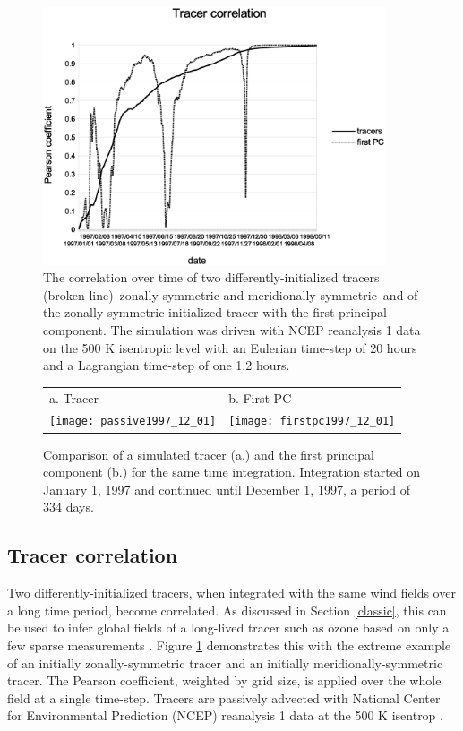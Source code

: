 \begin{figure}
\begin{center}
\includegraphics[width=0.9\textwidth]{tracer_correlation}
\caption{The correlation over time of two differently-initialized tracers
(broken line)--zonally symmetric and meridionally symmetric--and of
the zonally-symmetric-initialized tracer with the first principal component.
The simulation was driven with NCEP reanalysis 1 data on the 500 K isentropic
level with an Eulerian time-step of 20 hours and a Lagrangian time-step
of one 1.2 hours.}\label{tcorr}
\end{center}
\end{figure}

\begin{figure}
\begin{tabular}{ll}
a. Tracer & b. First PC\\
\texttt{[image: passive1997\_12\_01]} &
\texttt{[image: firstpc1997\_12\_01]}
\end{tabular}
\caption{Comparison of a simulated tracer (a.) and the first principal
component (b.) for the same time integration.
Integration started on January 1, 1997 and continued until December 1, 1997, a period of 334 days.}\label{pc1}
\end{figure}

\subsection{Tracer correlation}

Two differently-initialized tracers, when integrated with the same
wind fields over a long time period, become correlated.
As discussed in Section \ref{classic},
this can be used to infer global fields of a long-lived tracer such as
ozone based on only a few sparse measurements 
\citep{Allen_Nakamura2003,Randall_etal2002}.
Figure \ref{tcorr} demonstrates this with the extreme example of an initially
zonally-symmetric tracer and an initially meridionally-symmetric tracer.
The Pearson coefficient, weighted by grid size, is applied over the whole field at a single time-step.
Tracers are passively advected with National Center for Environmental Prediction
(NCEP) reanalysis 1 data at the 500 K isentrop \citep{Kalnay_etal1996}.

